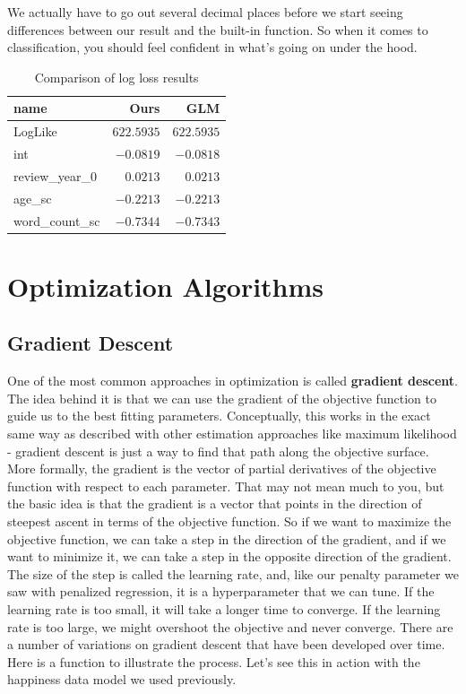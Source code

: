 \documentclass[
  letterpaper,
]{krantz}
\begin{document}
We actually have to go out several decimal places before we start seeing
differences between our result and the built-in function. So when it
comes to classification, you should feel confident in what's going on
under the hood.

\hypertarget{tbl-logloss}{}
\begin{longtable}{lrr}
\caption{\label{tbl-logloss}Comparison of log loss results }\tabularnewline

\toprule
name & Ours & GLM \\ 
\midrule
LogLike & $622.5935$ & $622.5935$ \\ 
int & $-0.0819$ & $-0.0818$ \\ 
review\_year\_0 & $0.0213$ & $0.0213$ \\ 
age\_sc & $-0.2213$ & $-0.2213$ \\ 
word\_count\_sc & $-0.7344$ & $-0.7343$ \\ 
\bottomrule
\end{longtable}

\section{Optimization Algorithms}\label{optimization-algorithms}

\subsection{Gradient Descent}\label{gradient-descent}

One of the most common approaches in optimization is called
\textbf{gradient descent}. The idea behind it is that we can use the
gradient of the objective function to guide us to the best fitting
parameters. Conceptually, this works in the exact same way as described
with other estimation approaches like maximum likelihood - gradient
descent is just a way to find that path along the objective surface.
More formally, the gradient is the vector of partial derivatives of the
objective function with respect to each parameter. That may not mean
much to you, but the basic idea is that the gradient is a vector that
points in the direction of steepest ascent in terms of the objective
function. So if we want to maximize the objective function, we can take
a step in the direction of the gradient, and if we want to minimize it,
we can take a step in the opposite direction of the gradient. The size
of the step is called the learning rate, and, like our penalty parameter
we saw with penalized regression, it is a hyperparameter that we can
tune. If the learning rate is too small, it will take a longer time to
converge. If the learning rate is too large, we might overshoot the
objective and never converge. There are a number of variations on
gradient descent that have been developed over time. Here is a function
to illustrate the process. Let's see this in action with the happiness
data model we used previously.
\end{document}
